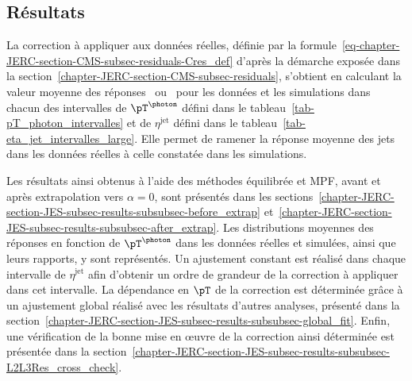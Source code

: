 \subsection{Résultats}\label{chapter-JERC-section-JES-subsec-results}
La correction à appliquer aux données réelles, définie par la formule~\eqref{eq-chapter-JERC-section-CMS-subsec-residuals-Cres_def} d'après la démarche exposée dans la section~\ref{chapter-JERC-section-CMS-subsec-residuals}, s'obtient en calculant la valeur moyenne des réponses \Rbal\ ou \RMPF\ pour les données et les simulations dans chacun des intervalles
de $\pT^{\photon}$ défini dans le tableau~\ref{tab-pT_photon_intervalles} et
de $\eta^\text{jet}$ défini dans le tableau~\ref{tab-eta_jet_intervalles_large}.
Elle permet de ramener la réponse moyenne des jets dans les données réelles à celle constatée dans les simulations.
\par Les résultats ainsi obtenus à l'aide des méthodes équilibrée et MPF, avant et après extrapolation vers $\alpha=0$, sont présentés dans les sections~\ref{chapter-JERC-section-JES-subsec-results-subsubsec-before_extrap} et~\ref{chapter-JERC-section-JES-subsec-results-subsubsec-after_extrap}.
Les distributions moyennes des réponses en fonction de $\pT^{\photon}$ dans les données réelles et simulées, ainsi que leurs rapports, y sont représentés.
Un ajustement constant est réalisé dans chaque intervalle de $\eta^\text{jet}$ afin d'obtenir un ordre de grandeur de la correction à appliquer dans cet intervalle.
La dépendance en $\pT$ de la correction est déterminée grâce à un ajustement global réalisé avec les résultats d'autres analyses, présenté dans la section~\ref{chapter-JERC-section-JES-subsec-results-subsubsec-global_fit}.
Enfin, une vérification de la bonne mise en œuvre de la correction ainsi déterminée est présentée dans la section~\ref{chapter-JERC-section-JES-subsec-results-subsubsec-L2L3Res_cross_check}.
